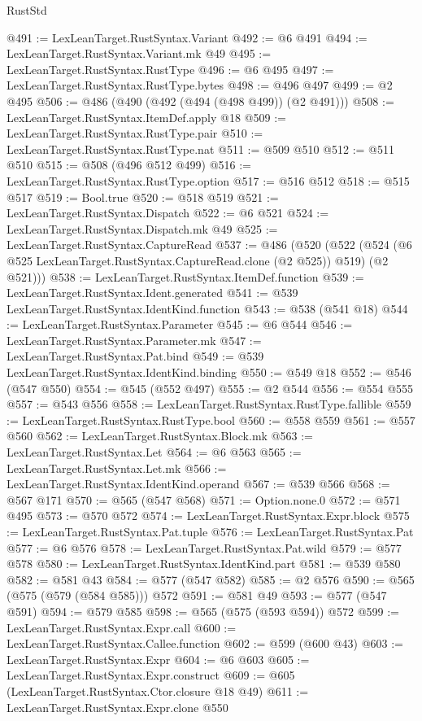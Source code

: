 \begin{lexlean}{RustStd}
\begin{coremodule}
@491 := LexLeanTarget.RustSyntax.Variant
@492 := @6 @491
@494 := LexLeanTarget.RustSyntax.Variant.mk @49
@495 := LexLeanTarget.RustSyntax.RustType
@496 := @6 @495
@497 := LexLeanTarget.RustSyntax.RustType.bytes
@498 := @496 @497
@499 := @2 @495
@506 := @486 (@490 (@492 (@494 (@498 @499)) (@2 @491)))
@508 := LexLeanTarget.RustSyntax.ItemDef.apply @18
@509 := LexLeanTarget.RustSyntax.RustType.pair
@510 := LexLeanTarget.RustSyntax.RustType.nat
@511 := @509 @510
@512 := @511 @510
@515 := @508 (@496 @512 @499)
@516 := LexLeanTarget.RustSyntax.RustType.option
@517 := @516 @512
@518 := @515 @517
@519 := Bool.true
@520 := @518 @519
@521 := LexLeanTarget.RustSyntax.Dispatch
@522 := @6 @521
@524 := LexLeanTarget.RustSyntax.Dispatch.mk @49
@525 := LexLeanTarget.RustSyntax.CaptureRead
@537 := @486
    (@520
      (@522 (@524 (@6 @525 LexLeanTarget.RustSyntax.CaptureRead.clone (@2 @525)) @519) (@2 @521)))
@538 := LexLeanTarget.RustSyntax.ItemDef.function
@539 := LexLeanTarget.RustSyntax.Ident.generated
@541 := @539 LexLeanTarget.RustSyntax.IdentKind.function
@543 := @538 (@541 @18)
@544 := LexLeanTarget.RustSyntax.Parameter
@545 := @6 @544
@546 := LexLeanTarget.RustSyntax.Parameter.mk
@547 := LexLeanTarget.RustSyntax.Pat.bind
@549 := @539 LexLeanTarget.RustSyntax.IdentKind.binding
@550 := @549 @18
@552 := @546 (@547 @550)
@554 := @545 (@552 @497)
@555 := @2 @544
@556 := @554 @555
@557 := @543 @556
@558 := LexLeanTarget.RustSyntax.RustType.fallible
@559 := LexLeanTarget.RustSyntax.RustType.bool
@560 := @558 @559
@561 := @557 @560
@562 := LexLeanTarget.RustSyntax.Block.mk
@563 := LexLeanTarget.RustSyntax.Let
@564 := @6 @563
@565 := LexLeanTarget.RustSyntax.Let.mk
@566 := LexLeanTarget.RustSyntax.IdentKind.operand
@567 := @539 @566
@568 := @567 @171
@570 := @565 (@547 @568)
@571 := Option.none.{0}
@572 := @571 @495
@573 := @570 @572
@574 := LexLeanTarget.RustSyntax.Expr.block
@575 := LexLeanTarget.RustSyntax.Pat.tuple
@576 := LexLeanTarget.RustSyntax.Pat
@577 := @6 @576
@578 := LexLeanTarget.RustSyntax.Pat.wild
@579 := @577 @578
@580 := LexLeanTarget.RustSyntax.IdentKind.part
@581 := @539 @580
@582 := @581 @43
@584 := @577 (@547 @582)
@585 := @2 @576
@590 := @565 (@575 (@579 (@584 @585))) @572
@591 := @581 @49
@593 := @577 (@547 @591)
@594 := @579 @585
@598 := @565 (@575 (@593 @594)) @572
@599 := LexLeanTarget.RustSyntax.Expr.call
@600 := LexLeanTarget.RustSyntax.Callee.function
@602 := @599 (@600 @43)
@603 := LexLeanTarget.RustSyntax.Expr
@604 := @6 @603
@605 := LexLeanTarget.RustSyntax.Expr.construct
@609 := @605 (LexLeanTarget.RustSyntax.Ctor.closure @18 @49)
@611 := LexLeanTarget.RustSyntax.Expr.clone @550

\end{coremodule}
\end{lexlean}
